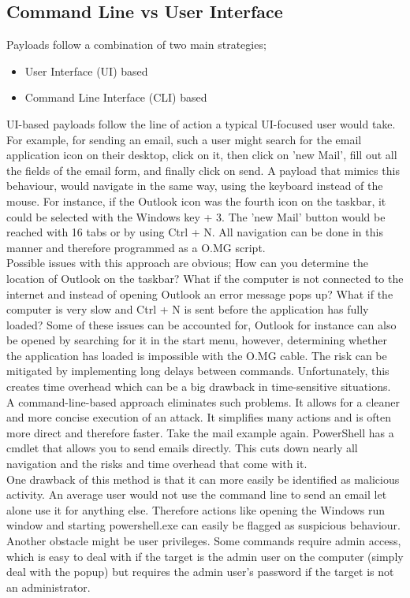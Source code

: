\subsection{Command Line vs User Interface}

Payloads follow a combination of two main strategies; 
\begin{itemize}
    \item User Interface (UI) based
    \item Command Line Interface (CLI) based
\end{itemize}

UI-based payloads follow the line of action a typical UI-focused user would take. For example, for sending an email, such a user might search for the email application icon on their desktop, click on it, then click on 'new Mail', fill out all the fields of the email form, and finally click on send. A payload that mimics this behaviour, would navigate in the same way, using the keyboard instead of the mouse. For instance, if the Outlook icon was the fourth icon on the taskbar, it could be selected with the Windows key + 3. The 'new Mail' button would be reached with 16 tabs or by using  Ctrl + N. All navigation can be done in this manner and therefore programmed as a O.MG script. \\
Possible issues with this approach are obvious; How can you determine the location of Outlook on the taskbar? What if the computer is not connected to the internet and instead of opening Outlook an error message pops up? What if the computer is very slow and  Ctrl + N is sent before the application has fully loaded?  Some of these issues can be accounted for, Outlook for instance can also be opened by searching for it in the start menu, however, determining whether the application has loaded is impossible with the O.MG cable. The risk can be mitigated by implementing long delays between commands. Unfortunately, this creates time overhead which can be a big drawback in time-sensitive situations. \\

A command-line-based approach eliminates such problems. It allows for a cleaner and more concise execution of an attack. It simplifies many actions and is often more direct and therefore faster. Take the mail example again. PowerShell has a cmdlet that allows you to send emails directly. This cuts down nearly all navigation and the risks and time overhead that come with it. \\
One drawback of this method is that it can more easily be identified as malicious activity. An average user would not use the command line to send an email let alone use it for anything else. Therefore actions like opening the Windows run window and starting powershell.exe can easily be flagged as suspicious behaviour. Another obstacle might be user privileges. Some commands require admin access, which is easy to deal with if the target is the admin user on the computer (simply deal with the popup) but requires the admin user's password if the target is not an administrator. 



